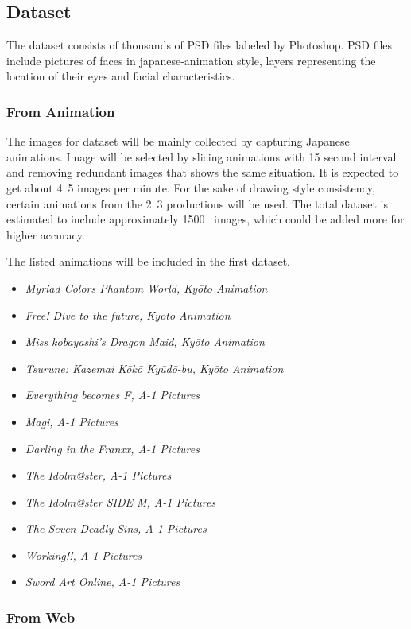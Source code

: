 \documentclass{article}
\begin{document}
\subsection{Dataset}

The dataset consists of thousands of PSD files labeled by Photoshop. PSD files include pictures of faces in japanese-animation style, layers representing the location of their eyes and facial characteristics.

\subsubsection{From Animation}
The images for dataset will be mainly collected by capturing Japanese animations.
Image will be selected by slicing animations with 15 second interval and removing redundant images that shows the same situation. It is expected to get about 4~5 images per minute.
For the sake of drawing style consistency, certain animations from the 2~3 productions will be used. The total dataset is estimated to include approximately 1500~ images, which could be added more for higher accuracy.

The listed animations will be included in the first dataset.
\begin{itemize}
\item \it{Myriad Colors Phantom World, Kyōto Animation}
\item \it{Free! Dive to the future, Kyōto Animation}
\item \it{Miss kobayashi's Dragon Maid, Kyōto Animation}
\item \it{Tsurune: Kazemai Kōkō Kyūdō-bu, Kyōto Animation}

\item \it{Everything becomes F, A-1 Pictures}
\item \it{Magi, A-1 Pictures}
\item \it{Darling in the Franxx, A-1 Pictures}
\item \it{The Idolm@ster, A-1 Pictures}
\item \it{The Idolm@ster SIDE M, A-1 Pictures}
\item \it{The Seven Deadly Sins, A-1 Pictures}
\item \it{Working!!, A-1 Pictures}
\item \it{Sword Art Online, A-1 Pictures}
\end{itemize}

\subsubsection{From Web}
\end{document}
